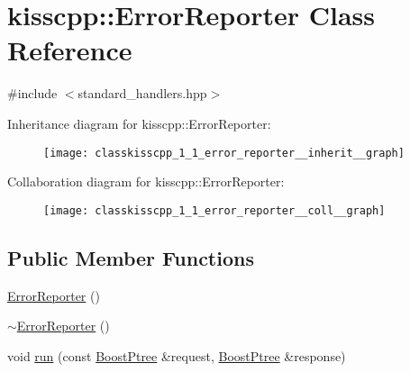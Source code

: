 \hypertarget{classkisscpp_1_1_error_reporter}{\section{kisscpp\-:\-:Error\-Reporter Class Reference}
\label{classkisscpp_1_1_error_reporter}
}


{\ttfamily \#include $<$standard\-\_\-handlers.\-hpp$>$}



Inheritance diagram for kisscpp\-:\-:Error\-Reporter\-:
\nopagebreak
\begin{figure}[H]
\begin{center}
\leavevmode
\texttt{[image: classkisscpp\_1\_1\_error\_reporter\_\_inherit\_\_graph]}
\end{center}
\end{figure}


Collaboration diagram for kisscpp\-:\-:Error\-Reporter\-:
\nopagebreak
\begin{figure}[H]
\begin{center}
\leavevmode
\texttt{[image: classkisscpp\_1\_1\_error\_reporter\_\_coll\_\_graph]}
\end{center}
\end{figure}
\subsection*{Public Member Functions}
\begin{DoxyCompactItemize}
\item 
\hyperlink{classkisscpp_1_1_error_reporter_ae772ce0549cded2acb8909b420c4b6d7}{Error\-Reporter} ()
\item 
\hyperlink{classkisscpp_1_1_error_reporter_a497e32bd73503b28283b3e64fd0ac45c}{$\sim$\-Error\-Reporter} ()
\item 
void \hyperlink{classkisscpp_1_1_error_reporter_a7afc458c0a447f93f138f006acb57117}{run} (const \hyperlink{boost__ptree_8hpp_ab36820650b8e0db36402aea80485633c}{Boost\-Ptree} \&request, \hyperlink{boost__ptree_8hpp_ab36820650b8e0db36402aea80485633c}{Boost\-Ptree} \&response)
\end{DoxyCompactItemize}


